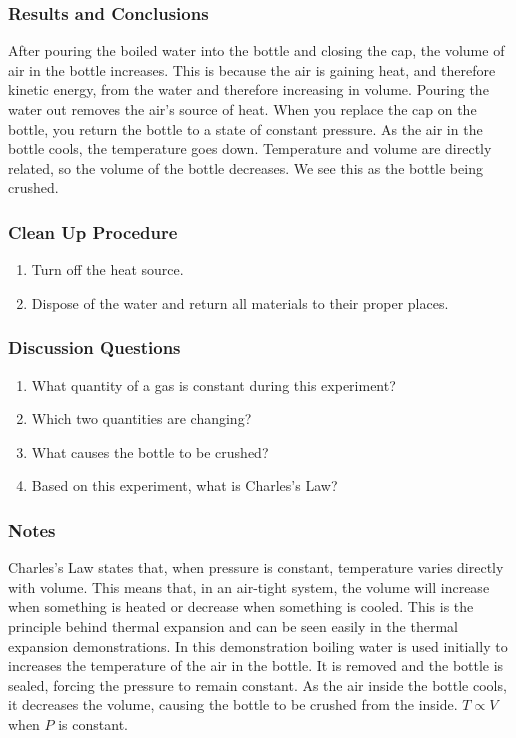 \subsubsection*{Results and Conclusions}
After pouring the boiled water into the bottle and closing the cap, the volume of air in the bottle increases.  This is because the air is gaining heat, and therefore kinetic energy, from the water and therefore increasing in volume.  Pouring the water out removes the air's source of heat.  When you replace the cap on the bottle, you return the bottle to a state of constant pressure.  As the air in the bottle cools, the temperature goes down.  Temperature and volume are directly related, so the volume of the bottle decreases.  We see this as the bottle being crushed.

\subsubsection*{Clean Up Procedure}
\begin{enumerate}
\item{Turn off the heat source.} 
\item{Dispose of the water and return all materials to their proper places.} 
\end{enumerate}

\subsubsection*{Discussion Questions}
\begin{enumerate}
\item{What quantity of a gas is constant during this experiment?}
\item{Which two quantities are changing?}
\item{What causes the bottle to be crushed?}
\item{Based on this experiment, what is Charles's Law?}
\end{enumerate}

\subsubsection*{Notes}
Charles's Law states that, when pressure is constant, temperature varies directly with volume. This means that, in an air-tight system, the volume will increase when something is heated or decrease when something is cooled. This is the principle behind thermal expansion and can be seen easily in the thermal expansion demonstrations.  
In this demonstration boiling water is used initially to increases the temperature of the air in the bottle. It is removed and the bottle is sealed, forcing the pressure to remain constant. As the air inside the bottle cools, it decreases the volume, causing the bottle to be crushed from the inside. $T \propto V$ when $P$ is constant.


